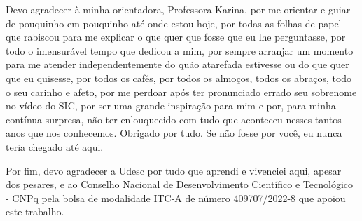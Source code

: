 \begin{agradecimentos}
    Devo agradecer à minha orientadora, Professora Karina, por me orientar e guiar de pouquinho em pouquinho até onde estou hoje,
    por todas as folhas de papel que rabiscou para me explicar o que quer que fosse que eu lhe perguntasse, por todo o imensurável tempo que dedicou a mim, por sempre arranjar
    um momento para me atender independentemente do quão atarefada estivesse ou do que quer que eu quisesse, por todos os cafés, por todos os almoços, todos os abraços,
    todo o seu carinho e afeto, por me perdoar após ter pronunciado errado seu sobrenome no vídeo do SIC, por ser uma grande inspiração para mim e por, para minha contínua surpresa,
    não ter enlouquecido com tudo que aconteceu nesses tantos anos que nos conhecemos. Obrigado por tudo. Se não fosse por você, eu nunca teria chegado até aqui.

    Por fim, devo agradecer a Udesc por tudo que aprendi e vivenciei aqui, apesar dos pesares, e ao Conselho Nacional de Desenvolvimento Científico e Tecnológico - CNPq
    pela bolsa de modalidade ITC-A de número 409707/2022-8 que apoiou este trabalho.
\end{agradecimentos}
